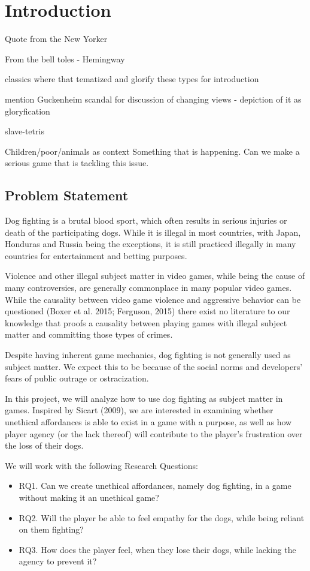 \documentclass[preprint,12pt, authoryear]{elsarticle}
\begin{document}
\section{Introduction}
Quote from the New Yorker\

From the bell toles - Hemingway\

classics where that tematized and glorify these types
for introduction\

mention Guckenheim scandal for discussion of changing views - depiction of it as gloryfication\

slave-tetris\

Children/poor/animals as context
	Something that is happening. Can we make a serious game that is tackling this issue.


\subsection{Problem Statement}
\label{ProbStat}

Dog fighting is a brutal blood sport, which often results in serious injuries or death of the participating dogs. While it is illegal in most countries, with Japan, Honduras and Russia being the exceptions, it is still practiced illegally in many countries for entertainment and betting purposes. \

Violence and other illegal subject matter in video games, while being the cause of many controversies, are generally commonplace in many popular video games. While the causality between video game violence and aggressive behavior can be questioned (Boxer et al. 2015; Ferguson, 2015) there exist no literature to our knowledge that proofs a causality between playing games with illegal subject matter and committing those types of crimes. \

Despite having inherent game mechanics, dog fighting is not generally used as subject matter. We expect this to be because of the social norms and developers’ fears of public outrage or ostracization. \

In this project, we will analyze how to use dog fighting as subject matter in games. Inspired by Sicart (2009), we are interested in examining whether unethical affordances is able to exist in a game with a purpose, as well as how player agency (or the lack thereof) will contribute to the player’s frustration over the loss of their dogs. \

We will work with the following Research Questions:

\begin{itemize}
\item RQ1. Can we create unethical affordances, namely dog fighting, in a game without making it an unethical game?
\item RQ2. Will the player be able to feel empathy for the dogs, while being reliant on them fighting?
\item RQ3. How does the player feel, when they lose their dogs, while lacking the agency to prevent it?
\end{itemize}
\end{document}
